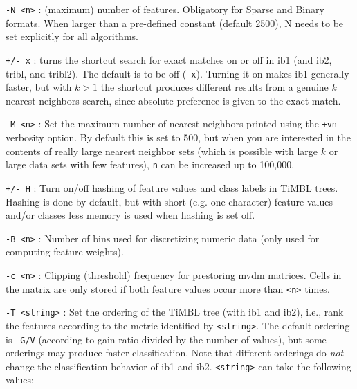 \documentclass{report}
\begin{document}
\begin{description}

\item {\tt -N <n>} : (maximum) number of features. Obligatory for
  Sparse and Binary formats. When larger than a pre-defined constant
  (default 2500), N needs to be set explicitly for all algorithms.

\item {\tt +/- x} : turns the shortcut search for exact matches on or
  off in {\sc ib1} (and {\sc ib2}, {\sc tribl}, and {\sc tribl2}). The
  default is to be off ({\tt -x}). Turning it on makes {\sc ib1}
  generally faster, but with $k>1$ the shortcut produces different
  results from a genuine $k$ nearest neighbors search, since absolute
  preference is given to the exact match.

\item {\tt -M <n>} : Set the maximum number of nearest neighbors
  printed using the {\tt +vn} verbosity option. By default this is set
  to 500, but when you are interested in the contents of really large
  nearest neighbor sets (which is possible with large $k$ or large
  data sets with few features), {\tt n} can be increased up to
  100,000.

\item {\tt +/- H} : Turn on/off hashing of feature values and class
  labels in TiMBL trees. Hashing is done by default, but with short
  (e.g. one-character) feature values and/or classes less memory is
  used when hashing is set off.

\item {\tt -B <n>} : Number of bins used for discretizing numeric data
  (only used for computing feature weights).

\item {\tt -c <n>} : Clipping (threshold) frequency for prestoring
  {\sc mvdm} matrices. Cells in the matrix are only stored if both
  feature values occur more than {\tt <n>} times.

\item {\tt -T <string>} : Set the ordering of the TiMBL tree (with
  {\sc ib1} and {\sc ib2}), i.e., rank the features according to the
  metric identified by {\tt <string>}. The default ordering is {\tt
    G/V} (according to gain ratio divided by the number of values),
  but some orderings may produce faster classification. Note that
  different orderings do {\em not}\/ change the classification
  behavior of {\sc ib1} and {\sc ib2}. {\tt <string>} can take the
  following values:


\end{description}
\end{document}
